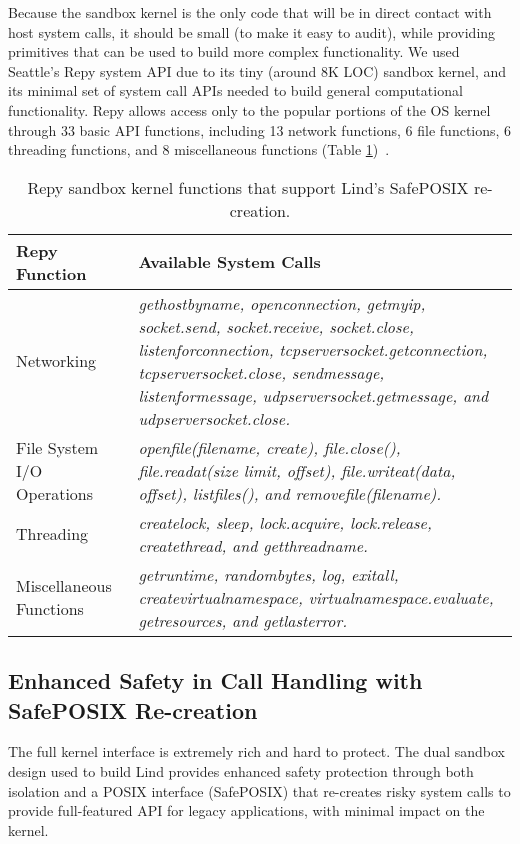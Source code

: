 Because the sandbox kernel is the only code that will be in direct contact with host
system calls, it should be small (to make it easy to audit), while providing
primitives that can be used to build more complex functionality.
We used Seattle's Repy system API due to its tiny (around 8K LOC) sandbox
kernel, and its minimal set of system call APIs needed to build general
computational functionality. Repy allows access only to the popular portions of
the OS kernel through 33 basic API functions, including 13 network functions, 6
file functions, 6 threading functions, and 8 miscellaneous functions (Table
\ref{table:RepyKernel})~\cite{Repy-10, RepyKernel}.

\begin{table}
\centering
  \begin{tabular}{ | p{2.5cm} | p{4.5cm} |}
  \hline
  \textbf{Repy Function} & \textbf{Available System Calls}  \\ \hline

Networking & \emph{gethostbyname, openconnection, getmyip, socket.send, socket.receive, socket.close,
listenforconnection, tcpserversocket.getconnection, tcpserversocket.close, sendmessage, listenformessage,
udpserversocket.getmessage, and udpserversocket.close.} \\ \hline

File System I/O Operations & \emph{openfile(filename, create), file.close(), file.readat(size limit, offset), file.writeat(data, offset),
listfiles(), and removefile(filename).} \\ \hline

Threading & \emph{createlock, sleep, lock.acquire, lock.release, createthread, and getthreadname.} \\ \hline

Miscellaneous Functions & \emph{getruntime, randombytes, log, exitall, createvirtualnamespace,
virtualnamespace.evaluate, getresources, and getlasterror.}  \\ \hline
    \end{tabular}
    \caption{Repy sandbox kernel functions that support Lind's SafePOSIX re-creation.}
    \label{table:RepyKernel}
\end{table}


\subsection{Enhanced Safety in Call Handling with SafePOSIX Re-creation}

The full kernel interface is extremely rich and hard to protect.
The dual sandbox \lip design used to build Lind provides enhanced
safety protection through both isolation and a POSIX interface (SafePOSIX) that
re-creates risky system calls to
provide full-featured API for legacy applications, with minimal impact on the kernel.

